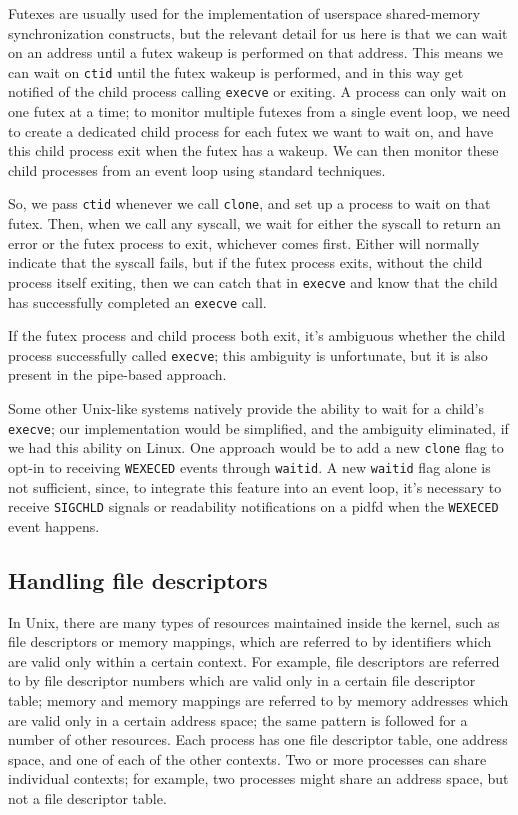 \documentclass[letterpaper,twocolumn,10pt]{article}
\begin{document}
Futexes are usually used for the implementation of userspace shared-memory synchronization constructs,
but the relevant detail for us here is that we can wait on an address
until a futex wakeup is performed on that address\cite{futex}.
This means we can wait on \texttt{ctid} until the futex wakeup is performed,
and in this way get notified of the child process calling \texttt{execve} or exiting.
A process can only wait on one futex at a time;
to monitor multiple futexes from a single event loop,
we need to create a dedicated child process for each futex we want to wait on,
and have this child process exit when the futex has a wakeup.
We can then monitor these child processes from an event loop using standard techniques\cite{signalfd}\cite{pidfd}.

So, we pass \texttt{ctid} whenever we call \texttt{clone},
and set up a process to wait on that futex.
Then, when we call any syscall,
we wait for either the syscall to return an error or the futex process to exit,
whichever comes first.
Either will normally indicate that the syscall fails,
but if the futex process exits,
without the child process itself exiting,
then we can catch that in \texttt{execve}
and know that the child has successfully completed an \texttt{execve} call.

If the futex process and child process both exit,
it's ambiguous whether the child process successfully called \texttt{execve};
this ambiguity is unfortunate, but it is also present in the pipe-based approach.

Some other Unix-like systems natively provide the ability to wait for a child's \texttt{execve};
our implementation would be simplified, and the ambiguity eliminated,
if we had this ability on Linux\cite{freebsd_kqueue}.
One approach would be to add a new \texttt{clone} flag to
opt-in to receiving \texttt{WEXECED} events through \texttt{waitid}.
A new \texttt{waitid} flag alone is not sufficient,
since, to integrate this feature into an event loop,
it's necessary to receive \texttt{SIGCHLD} signals or readability notifications on a pidfd
when the \texttt{WEXECED} event happens.
\subsection{Handling file descriptors}\label{fd_handles}
In Unix, there are many types of resources maintained inside the kernel,
such as file descriptors or memory mappings,
which are referred to by identifiers which are valid only within a certain context\cite{tlpi}.
For example, file descriptors are referred to by file descriptor numbers
which are valid only in a certain file descriptor table;
memory and memory mappings are referred to by memory addresses
which are valid only in a certain address space;
the same pattern is followed for a number of other resources.
Each process has one file descriptor table, one address space, and one of each of the other contexts.
Two or more processes can share individual contexts;
for example, two processes might share an address space, but not a file descriptor table.
\end{document}
